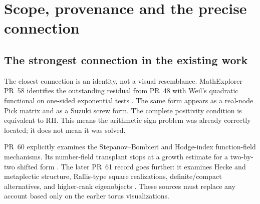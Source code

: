 \documentclass[11pt,letterpaper]{article}
\theoremstyle{definition}
\theoremstyle{remark}
\numberwithin{equation}{section}
\begin{document}
\begin{abstract}
We place the twin-ladder program in a fixed normalization of the completed Riemann zeta function and identify its one-sided residual energy with the Weil quadratic form. We give an explicit prime-truncation error bound and a sparse completion criterion: positivity of every finite prefix of the Pick kernel on the single sequence $x_j=1+1/(j+1)$ is equivalent to RH. The proof uses finite Nevanlinna--Pick interpolation, normal families and a holomorphic differential identity, and requires neither a uniform spectral gap nor uniformity in matrix size. Consequently an independently constructed family of asymptotically positive arithmetic Gram forms on these prefixes would suffice. We separately derive the Mellin transform and noncancellation of poles for the weighted Mangoldt discrepancy relevant to the announced theta-lift route. A one-sided full-ray square-root estimate implies RH by a classical Landau argument. The more delicate multiplicative-window theorem in the released source is recorded as an external import, not silently reproved. We explain how the project's prior mixing-flow obstruction leaves definite-target theta lifts open, and distinguish this opening from a proved construction. The final arithmetic comparison remains unresolved.
\end{abstract}
\setcounter{tocdepth}{1}
\tableofcontents
\newpage

\section{Scope, provenance and the precise connection}

\subsection{The strongest connection in the existing work}
The closest connection is an identity, not a visual resemblance. MathExplorer PR~58 identifies the outstanding residual from PR~48 with Weil's quadratic functional on one-sided exponential tests \cite{pr48,pr58}. The same form appears as a real-node Pick matrix and as a Suzuki screw form. The complete positivity condition is equivalent to RH. This means the arithmetic sign problem was already correctly located; it does not mean it was solved.

PR~60 explicitly examines the Stepanov--Bombieri and Hodge-index function-field mechanisms. Its number-field transplant stops at a growth estimate for a two-by-two shifted form \cite{pr60}. The later PR~61 record goes further: it examines Hecke and metaplectic structure, Rallis-type square realizations, definite/compact alternatives, and higher-rank eigenobjects \cite{pr61}. These sources must replace any account based only on the earlier torus visualizations.
\end{document}
